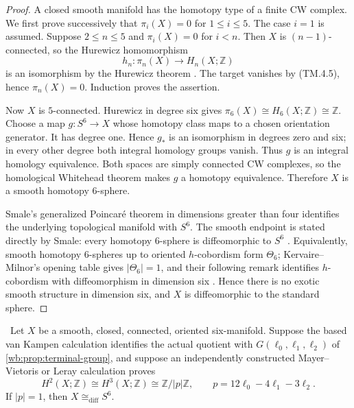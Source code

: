 \begin{proof}
A closed smooth manifold has the homotopy type of a finite CW complex.
We first prove successively that $\pi_i(X)=0$ for $1\le i\le5$.
The case $i=1$ is assumed.  Suppose $2\le n\le5$ and
$\pi_i(X)=0$ for $i<n$.  Then $X$ is $(n-1)$-connected, so the Hurewicz
homomorphism
\[
h_n:\pi_n(X)\longrightarrow H_n(X;\mathbb Z)
\]
is an isomorphism by the Hurewicz theorem
\cite[Theorem~4.32]{Hatcher2002}.  The target vanishes by (TM.4.5), hence
$\pi_n(X)=0$.  Induction proves the assertion.

Now $X$ is $5$-connected.  Hurewicz in degree six gives
$\pi_6(X)\cong H_6(X;\mathbb Z)\cong\mathbb Z$.  Choose a map
$g:S^6\to X$ whose homotopy class maps to a chosen orientation generator.
It has degree one.  Hence $g_*$ is an isomorphism in degrees zero and six;
in every other degree both integral homology groups vanish.  Thus $g$ is an
integral homology equivalence.  Both spaces are simply connected CW
complexes, so the homological Whitehead theorem
\cite[Corollary~4.33]{Hatcher2002} makes $g$ a homotopy equivalence.
Therefore $X$ is a smooth homotopy $6$-sphere.

Smale's generalized Poincar\'e theorem in dimensions greater than four
\cite[Theorem~A]{Smale1961} identifies the underlying topological manifold
with $S^6$.  The smooth endpoint is stated directly by Smale:
every homotopy $6$-sphere is diffeomorphic to $S^6$
\cite[Corollary~1.2]{Smale1962}.  Equivalently, smooth homotopy
$6$-spheres up to oriented $h$-cobordism form $\Theta_6$;
Kervaire--Milnor's opening table gives $|\Theta_6|=1$, and their following
remark identifies $h$-cobordism with diffeomorphism in dimension six
\cite[opening table and following Remark, pp.~504--505]{KervaireMilnor1963}.
Hence there is no exotic smooth structure in dimension six, and $X$ is
diffeomorphic to the standard sphere.
\end{proof}

\begin{corollary}\label{mapsI:top:cor:abstract-s6}
\ Let $X$ be a smooth, closed, connected, oriented six-manifold.
Suppose the based van Kampen calculation identifies the actual quotient
with $G(\ell_0,\ell_1,\ell_2)$ of
\cref{wb:prop:terminal-group}, and suppose an independently constructed
Mayer--Vietoris or Leray calculation proves
\[
H^2(X;\mathbb Z)\cong H^3(X;\mathbb Z)
\cong\mathbb Z/|p|\mathbb Z,
\qquad p=12\ell_0-4\ell_1-3\ell_2.
\tag{TM.4.6}
\]
If $|p|=1$, then $X\cong_{\mathrm{diff}}S^6$.
\end{corollary}

